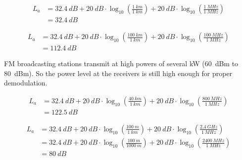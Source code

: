 \begin{solution}
	\begin{tasks}
		\task
		\begin{equation*}
			\begin{split}
				L_a &= \SI{32.4}{dB} + \SI{20}{dB} \cdot \log_{10}\left(\frac{\SI{1}{km}}{\SI{1}{km}}\right) + \SI{20}{dB} \cdot \log_{10}\left(\frac{\SI{1}{MHz}}{\SI{1}{MHz}}\right) \\
				 &= \SI{32.4}{dB}
			\end{split}
		\end{equation*}
		
		\task
		\begin{equation*}
			\begin{split}
				L_a &= \SI{32.4}{dB} + \SI{20}{dB} \cdot \log_{10}\left(\frac{\SI{100}{km}}{\SI{1}{km}}\right) + \SI{20}{dB} \cdot \log_{10}\left(\frac{\SI{100}{MHz}}{\SI{1}{MHz}}\right) \\
				 &= \SI{112.4}{dB}
			\end{split}
		\end{equation*}
		
		FM broadcasting stations transmit at high powers of several \si{kW} (\SI{60}{dBm} to \SI{80}{dBm}). So the power level at the receivers is still high enough for proper demodulation.
		
		\task
		\begin{equation*}
			\begin{split}
				L_a &= \SI{32.4}{dB} + \SI{20}{dB} \cdot \log_{10}\left(\frac{\SI{40}{km}}{\SI{1}{km}}\right) + \SI{20}{dB} \cdot \log_{10}\left(\frac{\SI{800}{MHz}}{\SI{1}{MHz}}\right) \\
				 &= \SI{122.5}{dB}
			\end{split}
		\end{equation*}
		
		\task
		\begin{equation*}
			\begin{split}
				L_a &= \SI{32.4}{dB} + \SI{20}{dB} \cdot \log_{10}\left(\frac{\SI{100}{m}}{\SI{1}{km}}\right) + \SI{20}{dB} \cdot \log_{10}\left(\frac{\SI{2.4}{GHz}}{\SI{1}{MHz}}\right) \\
				 &= \SI{32.4}{dB} + \SI{20}{dB} \cdot \log_{10}\left(\frac{\SI{100}{m}}{\SI{1000}{m}}\right) + \SI{20}{dB} \cdot \log_{10}\left(\frac{\SI{2400}{MHz}}{\SI{1}{MHz}}\right) \\
				 &= \SI{80}{dB}
			\end{split}
		\end{equation*}
		

\end{tasks}
\end{solution}
